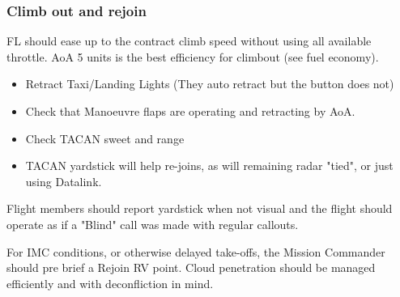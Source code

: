 \subsubsection{Climb out and rejoin}

FL should ease up to the contract climb speed without using all available
throttle. AoA 5 units is the best efficiency for climbout (see fuel economy).

\begin{itemize}

  \item Retract Taxi/Landing Lights (They auto retract but the button does not)

  \item Check that Manoeuvre flaps are operating and retracting by AoA.

  \item Check TACAN sweet and range

  \item TACAN yardstick will help re-joins, as will remaining radar "tied", or
    just using Datalink.

\end{itemize}

Flight members should report yardstick when not visual and the flight should
operate as if a "Blind" call was made with regular callouts.

For IMC conditions, or otherwise delayed take-offs, the Mission Commander
should pre brief a Rejoin RV point. Cloud penetration should be managed
efficiently and with deconfliction in mind.
